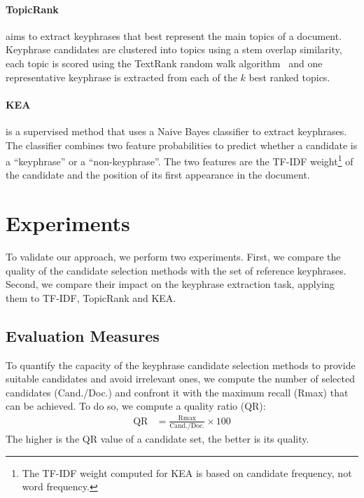   \paragraph{TopicRank~\textnormal{\cite{bougouin2013topicrank}}} aims to
  extract keyphrases that best represent the main topics of a document.
  Keyphrase candidates are clustered into topics using a stem overlap
  similarity, each topic is scored using the TextRank random walk
  algorithm~\cite{mihalcea2004textrank} and one representative keyphrase is
  extracted from each of the $k$ best ranked topics.

  \paragraph{KEA~\textnormal{\cite{witten1999kea}}} is a supervised method that
  uses a Naive Bayes classifier to extract keyphrases. The classifier combines
  two feature probabilities to predict whether a candidate is a ``keyphrase'' or
  a ``non-keyphrase''. The two features are the TF-IDF weight\footnote{The
    TF-IDF weight computed for KEA is based on candidate frequency, not word
  frequency.} of the candidate and the position of its first appearance in the
  document.

\section{Experiments}
\label{sec:evaluation}
  To validate our approach, we perform two experiments. First, we compare the
  quality of the candidate selection methods with the set of reference
  keyphrases. Second, we compare their impact on the keyphrase extraction task,
  applying them to TF-IDF, TopicRank and KEA.

  \subsection{Evaluation Measures}
  \label{subsec:keyphrase_extraction_evaluation_measures}
    To quantify the capacity of the keyphrase candidate selection methods to
    provide suitable candidates and avoid irrelevant ones, we compute the
    number of selected candidates (Cand./Doc.) and confront it with the
    maximum recall (Rmax) that can be achieved. To do so, we compute a quality
    ratio (QR):
    \begin{align}
      \text{QR} &= \frac{\text{Rmax}}{\text{Cand./Doc.}} \times 100
    \end{align}
    The higher is the QR value of a candidate set, the better is its quality.


